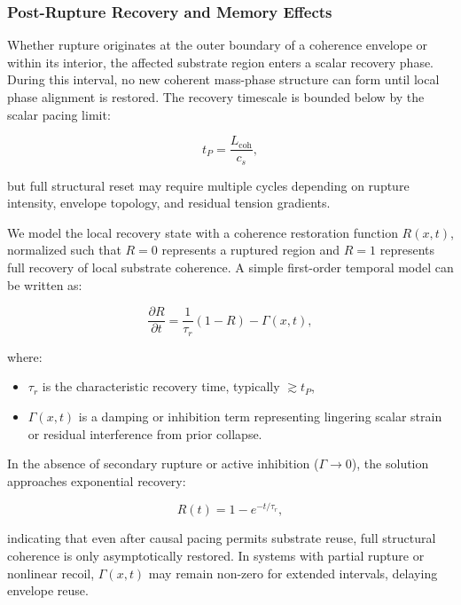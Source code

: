 \documentclass[entropy,article,submit,pdftex,moreauthors]{Definitions/mdpi}
\begin{document}
\subsubsection{Post-Rupture Recovery and Memory Effects}

Whether rupture originates at the outer boundary of a coherence envelope or within its interior, the affected substrate region enters a scalar recovery phase. During this interval, no new coherent mass-phase structure can form until local phase alignment is restored. The recovery timescale is bounded below by the scalar pacing limit:

\begin{equation}
t_P = \frac{L_{\text{coh}}}{c_s},
\end{equation}

but full structural reset may require multiple cycles depending on rupture intensity, envelope topology, and residual tension gradients.

We model the local recovery state with a coherence restoration function $R(x,t)$, normalized such that $R = 0$ represents a ruptured region and $R = 1$ represents full recovery of local substrate coherence. A simple first-order temporal model can be written as:

\begin{equation}
\frac{\partial R}{\partial t} = \frac{1}{\tau_r} (1 - R) - \Gamma(x,t),
\end{equation}

where:
\begin{itemize}
  \item $\tau_r$ is the characteristic recovery time, typically $\gtrsim t_P$,
  \item $\Gamma(x,t)$ is a damping or inhibition term representing lingering scalar strain or residual interference from prior collapse.
\end{itemize}

In the absence of secondary rupture or active inhibition ($\Gamma \rightarrow 0$), the solution approaches exponential recovery:

\begin{equation}
R(t) = 1 - e^{-t/\tau_r},
\end{equation}

indicating that even after causal pacing permits substrate reuse, full structural coherence is only asymptotically restored. In systems with partial rupture or nonlinear recoil, $\Gamma(x,t)$ may remain non-zero for extended intervals, delaying envelope reuse.
\end{document}
